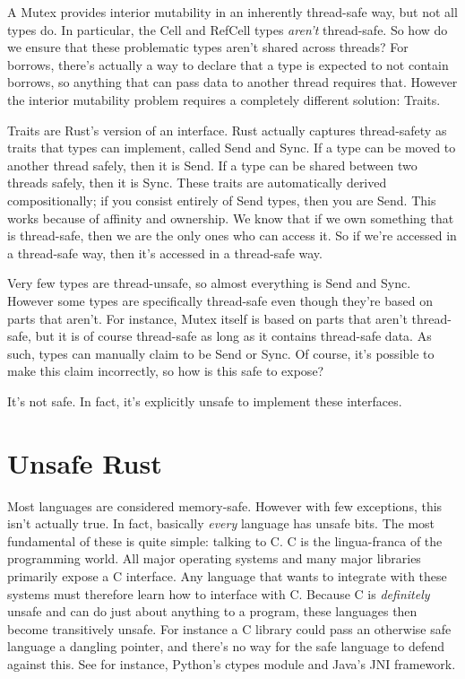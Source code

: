 A Mutex provides interior mutability in an inherently thread-safe way, but not
all types do. In particular, the Cell and RefCell types \emph{aren't} thread-safe.
So how do we ensure that these problematic types aren't shared across threads?
For borrows, there's actually a way to declare that a type is expected to not
contain borrows, so anything that can pass data to another thread requires that.
However the interior mutability problem requires a completely different solution:
Traits.

Traits are Rust's version of an interface. Rust actually captures thread-safety
as traits that types can implement, called Send and Sync. If a type can be moved
to another thread safely, then it is Send. If a type can be shared between two
threads safely, then it is Sync. These traits are automatically derived
compositionally; if you consist entirely of Send types, then you are Send. This
works because of affinity and ownership. We know that if we own something
that is thread-safe, then we are the only ones who can access it. So if we're
accessed in a thread-safe way, then it's accessed in a thread-safe way.

Very few types are thread-unsafe, so almost everything is Send and Sync. However
some types are specifically thread-safe even though they're based on parts that
aren't. For instance, Mutex itself is based on parts that aren't thread-safe, but
it is of course thread-safe as long as it contains thread-safe data. As such,
types can manually claim to be Send or Sync. Of course, it's possible to
make this claim incorrectly, so how is this safe to expose?

It's not safe. In fact, it's explicitly unsafe to implement these interfaces.



\section{Unsafe Rust}

Most languages are considered memory-safe. However with few exceptions, this
isn't actually true. In fact, basically \emph{every} language has unsafe bits.
The most fundamental of these is quite
simple: talking to C. C is the lingua-franca of the programming world. All
major operating systems and many major libraries primarily expose a C interface.
Any language that wants to integrate with these systems must therefore learn
how to interface with C. Because C is \emph{definitely} unsafe and can do just
about anything to a program, these languages then become transitively unsafe.
For instance a C library could pass an otherwise safe language a dangling
pointer, and there's no way for the safe language to defend against this.
See for instance, Python's ctypes module and Java's JNI framework.

